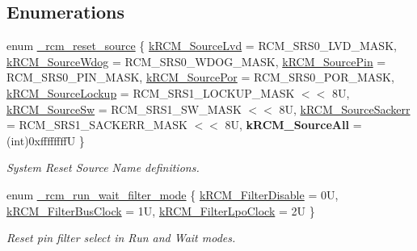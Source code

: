 \subsection*{Enumerations}
\begin{DoxyCompactItemize}
\item 
enum \mbox{\hyperlink{group__rcm_ga089aeb2329dd1c555a9a7493f3efff6a}{\+\_\+rcm\+\_\+reset\+\_\+source}} \{ \newline
\mbox{\hyperlink{group__rcm_gga089aeb2329dd1c555a9a7493f3efff6aa54ba70136d9bd9a7c3870c460b62d201}{k\+R\+C\+M\+\_\+\+Source\+Lvd}} = R\+C\+M\+\_\+\+S\+R\+S0\+\_\+\+L\+V\+D\+\_\+\+M\+A\+SK, 
\mbox{\hyperlink{group__rcm_gga089aeb2329dd1c555a9a7493f3efff6aa00ec8fcdac52298b30207e697b239317}{k\+R\+C\+M\+\_\+\+Source\+Wdog}} = R\+C\+M\+\_\+\+S\+R\+S0\+\_\+\+W\+D\+O\+G\+\_\+\+M\+A\+SK, 
\mbox{\hyperlink{group__rcm_gga089aeb2329dd1c555a9a7493f3efff6aaddb5ccbcacdb7d66f2f11d05b1bbbbce}{k\+R\+C\+M\+\_\+\+Source\+Pin}} = R\+C\+M\+\_\+\+S\+R\+S0\+\_\+\+P\+I\+N\+\_\+\+M\+A\+SK, 
\mbox{\hyperlink{group__rcm_gga089aeb2329dd1c555a9a7493f3efff6aa8e3deb7677a67b66eba21f47e30e38c6}{k\+R\+C\+M\+\_\+\+Source\+Por}} = R\+C\+M\+\_\+\+S\+R\+S0\+\_\+\+P\+O\+R\+\_\+\+M\+A\+SK, 
\newline
\mbox{\hyperlink{group__rcm_gga089aeb2329dd1c555a9a7493f3efff6aa52ce4dfb87219b9844eeff53f3391c84}{k\+R\+C\+M\+\_\+\+Source\+Lockup}} = R\+C\+M\+\_\+\+S\+R\+S1\+\_\+\+L\+O\+C\+K\+U\+P\+\_\+\+M\+A\+SK $<$$<$ 8U, 
\mbox{\hyperlink{group__rcm_gga089aeb2329dd1c555a9a7493f3efff6aac58247e936b5acc7c22d19ccd78b7c01}{k\+R\+C\+M\+\_\+\+Source\+Sw}} = R\+C\+M\+\_\+\+S\+R\+S1\+\_\+\+S\+W\+\_\+\+M\+A\+SK $<$$<$ 8U, 
\mbox{\hyperlink{group__rcm_gga089aeb2329dd1c555a9a7493f3efff6aab7584c0988c7c3d17d50b46aa096d710}{k\+R\+C\+M\+\_\+\+Source\+Sackerr}} = R\+C\+M\+\_\+\+S\+R\+S1\+\_\+\+S\+A\+C\+K\+E\+R\+R\+\_\+\+M\+A\+SK $<$$<$ 8U, 
{\bfseries k\+R\+C\+M\+\_\+\+Source\+All} = (int)0xffffffffU
 \}
\begin{DoxyCompactList}\small\item\em System Reset Source Name definitions. \end{DoxyCompactList}\item 
enum \mbox{\hyperlink{group__rcm_ga1e89ca2ffc3856208be42ca30c191b4d}{\+\_\+rcm\+\_\+run\+\_\+wait\+\_\+filter\+\_\+mode}} \{ \mbox{\hyperlink{group__rcm_gga1e89ca2ffc3856208be42ca30c191b4da4f443269fde273869a3fd58d7abd7146}{k\+R\+C\+M\+\_\+\+Filter\+Disable}} = 0U, 
\mbox{\hyperlink{group__rcm_gga1e89ca2ffc3856208be42ca30c191b4da9d5a578869f9e64858534023b25ec4c5}{k\+R\+C\+M\+\_\+\+Filter\+Bus\+Clock}} = 1U, 
\mbox{\hyperlink{group__rcm_gga1e89ca2ffc3856208be42ca30c191b4da81e3616b572cab719d101e8fecc41136}{k\+R\+C\+M\+\_\+\+Filter\+Lpo\+Clock}} = 2U
 \}
\begin{DoxyCompactList}\small\item\em Reset pin filter select in Run and Wait modes. \end{DoxyCompactList}\end{DoxyCompactItemize}
